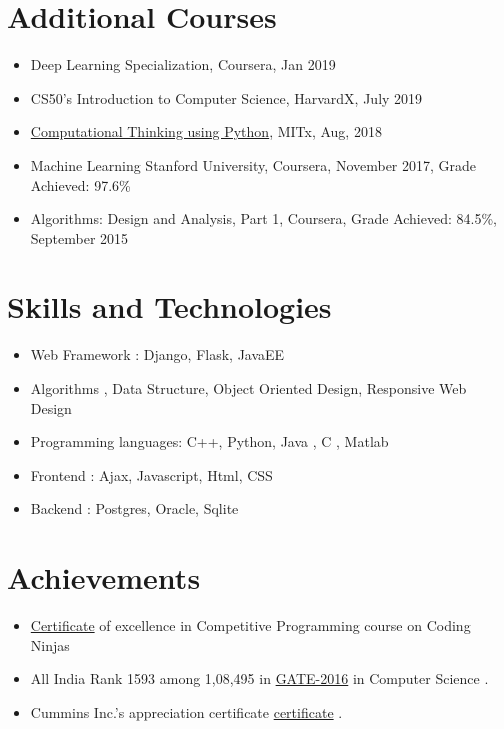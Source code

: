 \documentclass[a4paper,10pt]{article}
\begin{document}
    \section{Additional Courses}
	\begin{itemize}
	        \item Deep Learning Specialization, Coursera, Jan 2019
            \item CS50's Introduction to Computer Science, HarvardX, July 2019
	        \item \href{https://credentials.edx.org/credentials/bc6063317f6249019179899eb0c5aacb/}{Computational Thinking using Python}, MITx, Aug, 2018
	        \item Machine Learning Stanford University, Coursera, November 2017, Grade Achieved: 97.6\%
	        \item Algorithms: Design and Analysis, Part 1, Coursera, Grade Achieved: 84.5\%, September 2015
	    \end{itemize}
	
	\section{Skills and Technologies}
	\begin{itemize}
		\item Web Framework : Django, Flask, JavaEE
		\item Algorithms , Data Structure, Object Oriented Design, Responsive Web Design
        		\item Programming languages: C++, Python, Java , C , Matlab 
		\item Frontend : Ajax, Javascript, Html, CSS
		\item Backend : Postgres, Oracle, Sqlite
	\end{itemize}
	
	\section{Achievements}
	\begin{itemize}
	\item \href{http://files.codingninjas.in/certificate120385127582f078b1b89fee75fd48d65c87741.pdf}{Certificate} of excellence in Competitive Programming course on Coding Ninjas
		\item All India Rank 1593 among 1,08,495  in \href{https://drive.google.com/file/d/0B-2PYJZE99wQb1NCVHZFQjBsb0U/view}{GATE-2016} in Computer Science .
                \item Cummins Inc.’s appreciation certificate \href{https://drive.google.com/file/d/0B2kfGzkUmzWdbHJJZTRSLWJRVEE/view}{certificate} .
	\end{itemize}
\end{document}
